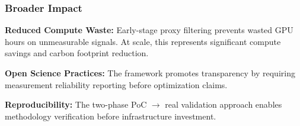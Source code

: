 \subsubsection{Broader Impact}

\textbf{Reduced Compute Waste:} Early-stage proxy filtering prevents wasted GPU hours on unmeasurable signals. At scale, this represents significant compute savings and carbon footprint reduction.

\textbf{Open Science Practices:} The framework promotes transparency by requiring measurement reliability reporting before optimization claims.

\textbf{Reproducibility:} The two-phase PoC $\rightarrow$ real validation approach enables methodology verification before infrastructure investment.
